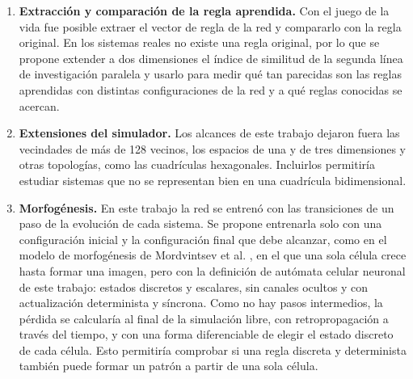 \begin{enumerate}
	\item \textbf{Extracción y comparación de la regla aprendida.} Con el juego de la vida fue posible extraer el vector de regla de la red y compararlo con la regla original. En los sistemas reales no existe una regla original, por lo que se propone extender a dos dimensiones el índice de similitud de la segunda línea de investigación paralela y usarlo para medir qué tan parecidas son las reglas aprendidas con distintas configuraciones de la red y a qué reglas conocidas se acercan.

	\item \textbf{Extensiones del simulador.} Los alcances de este trabajo dejaron fuera las vecindades de más de 128 vecinos, los espacios de una y de tres dimensiones y otras topologías, como las cuadrículas hexagonales. Incluirlos permitiría estudiar sistemas que no se representan bien en una cuadrícula bidimensional.

	\item \textbf{Morfogénesis.} En este trabajo la red se entrenó con las transiciones de un paso de la evolución de cada sistema. Se propone entrenarla solo con una configuración inicial y la configuración final que debe alcanzar, como en el modelo de morfogénesis de Mordvintsev et al. \cite{mordvintsev2020_nca}, en el que una sola célula crece hasta formar una imagen, pero con la definición de autómata celular neuronal de este trabajo: estados discretos y escalares, sin canales ocultos y con actualización determinista y síncrona. Como no hay pasos intermedios, la pérdida se calcularía al final de la simulación libre, con retropropagación a través del tiempo, y con una forma diferenciable de elegir el estado discreto de cada célula. Esto permitiría comprobar si una regla discreta y determinista también puede formar un patrón a partir de una sola célula.

\end{enumerate}
